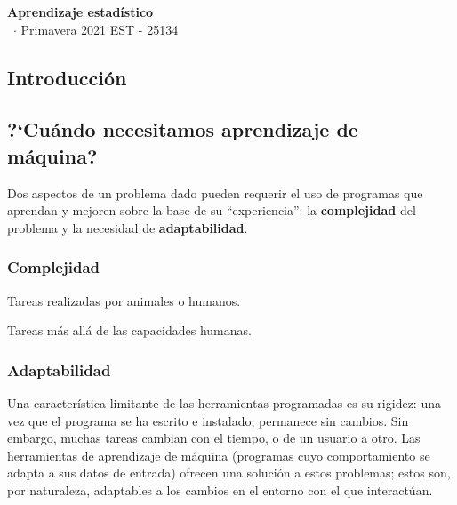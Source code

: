 \documentclass[8pt,a4paper]{extarticle}
\renewcommand{\csClass}{Aprendizaje estadístico}
\renewcommand{\csClassCode}{EST - 25134}
\renewcommand{\csTerm}{Primavera 2021}
\begin{document}
\begin{titlepage}
    \begin{center}
	\vspace*{1cm}
	\Huge
        \textbf{\csClass}
	\vspace{0.5cm} \\
	\Large
        \cs\ $\cdot$ \csTerm
        \vfill
        \csAuthorName
	\vspace{0.8cm}
        \csClassCode\\
        \csSchool     
    \end{center}
\end{titlepage}

\begin{multicols}{3}
\setcounter{page}{1}

\section*{Introducción}

\subsection*{?`Cuándo necesitamos aprendizaje de máquina?}

Dos aspectos de un problema dado pueden requerir el uso de programas que aprendan y mejoren sobre la base de su ``experiencia'': la \textbf{complejidad} del problema y la necesidad de \textbf{adaptabilidad}.

\subsubsection*{Complejidad}

\begin{bulletlist}
\item Tareas realizadas por animales o humanos.
\item Tareas más allá de las capacidades humanas.
\end{bulletlist}

\subsubsection*{Adaptabilidad}

Una característica limitante de las herramientas programadas es su rigidez: una vez que el programa se ha escrito e instalado, permanece sin cambios. Sin embargo, muchas tareas cambian con el tiempo, o de un usuario a otro. Las herramientas de aprendizaje de máquina (programas cuyo comportamiento se adapta a sus datos de entrada) ofrecen una solución a estos problemas; estos son, por naturaleza, adaptables a los cambios en el entorno con el que interactúan.


\end{multicols}
\end{document}
